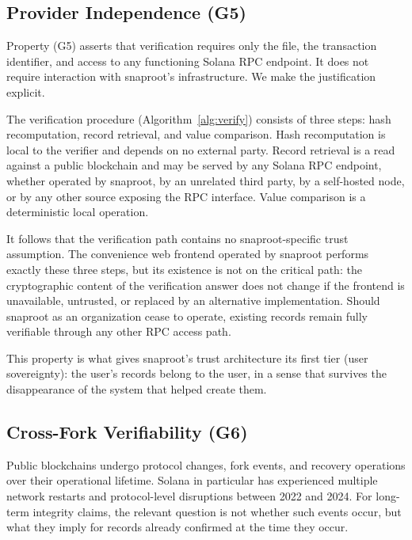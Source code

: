 \documentclass[11pt,a4paper]{article}
\begin{document}
\subsection{Provider Independence (G5)}
\label{sec:security:provider}

Property (G5) asserts that verification requires only the file, the
transaction identifier, and access to any functioning Solana RPC
endpoint. It does not require interaction with snaproot's
infrastructure. We make the justification explicit.

The verification procedure (Algorithm~\ref{alg:verify}) consists of
three steps: hash recomputation, record retrieval, and value
comparison. Hash recomputation is local to the verifier and depends on
no external party. Record retrieval is a read against a public
blockchain and may be served by any Solana RPC endpoint, whether
operated by snaproot, by an unrelated third party, by a self-hosted
node, or by any other source exposing the RPC interface. Value
comparison is a deterministic local operation.

It follows that the verification path contains no snaproot-specific
trust assumption. The convenience web frontend operated by snaproot
performs exactly these three steps, but its existence is not on the
critical path: the cryptographic content of the verification answer
does not change if the frontend is unavailable, untrusted, or replaced
by an alternative implementation. Should snaproot as an organization
cease to operate, existing records remain fully verifiable through any
other RPC access path.

This property is what gives snaproot's trust architecture its first
tier (user sovereignty): the user's records belong to the user, in a
sense that survives the disappearance of the system that helped
create them.

\subsection{Cross-Fork Verifiability (G6)}
\label{sec:security:crossfork}

Public blockchains undergo protocol changes, fork events, and recovery
operations over their operational lifetime. Solana in particular has
experienced multiple network restarts and protocol-level disruptions
between 2022 and 2024. For long-term integrity claims, the relevant
question is not whether such events occur, but what they imply for
records already confirmed at the time they occur.
\end{document}
